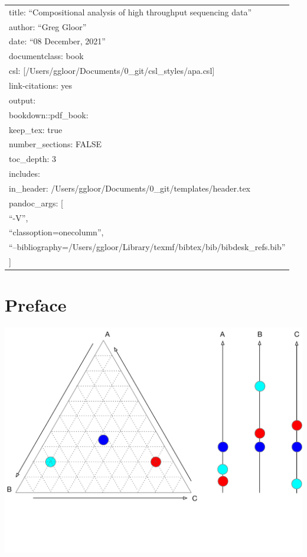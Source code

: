 \documentclass[
  onecolumn]{article}
\author{}
\date{\vspace{-2.5em}}
\begin{document}
{
\setcounter{tocdepth}{3}
\tableofcontents
}
\begin{longtable}[]{@{}l@{}}
\toprule
\endhead
title: ``Compositional analysis of high throughput sequencing data'' \\
author: ``Greg Gloor'' \\
date: ``08 December, 2021'' \\
documentclass: book \\
csl: {[}/Users/ggloor/Documents/0\_git/csl\_styles/apa.csl{]} \\
link-citations: yes \\
output: \\
bookdown::pdf\_book: \\
keep\_tex: true \\
number\_sections: FALSE \\
toc\_depth: 3 \\
includes: \\
in\_header: /Users/ggloor/Documents/0\_git/templates/header.tex \\
pandoc\_args: {[} \\
``-V'', \\
``classoption=onecolumn'', \\
``--bibliography=/Users/ggloor/Library/texmf/bibtex/bib/bibdesk\_refs.bib'' \\
{]} \\
\bottomrule
\end{longtable}

\hypertarget{preface}{%
\section*{Preface}\label{preface}}

\includegraphics{figs/simplex.pdf}
\end{document}
